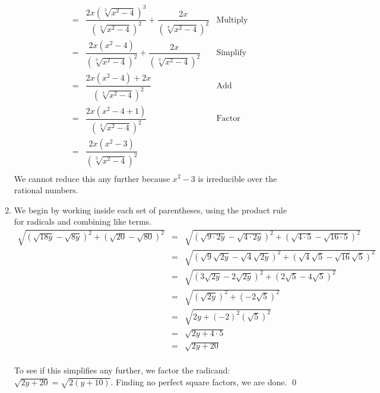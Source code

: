 \begin{ex}
\begin{enumerate}
\[\begin{array}{rclr}
& = & \dfrac{2x(\sqrt[3]{x^2-4})^3}{(\sqrt[3]{x^2-4})^2} + \dfrac{2x}{(\sqrt[3]{x^2-4})^2} & \text{Multiply}\\[12pt]

& = & \dfrac{2x(x^2-4)}{(\sqrt[3]{x^2-4})^2} + \dfrac{2x}{(\sqrt[3]{x^2-4})^2} & \text{Simplify}\\ [12pt]

& = & \dfrac{2x(x^2-4) + 2x}{(\sqrt[3]{x^2-4})^2} & \text{Add} \\ [12pt]


& = & \dfrac{2x(x^2-4 +1)}{(\sqrt[3]{x^2-4})^2} & \text{Factor}\\ [12pt]


& = & \dfrac{2x(x^2-3)}{(\sqrt[3]{x^2-4})^2} & \\

\end{array}\] We cannot reduce this any further because $x^2 - 3$ is irreducible over the rational numbers. 


\item  We begin by working inside each set of parentheses, using the product rule for radicals and combining like terms.\[ \begin{array}{rclr}


 \sqrt{(\sqrt{18y} - \sqrt{8y})^2 + (\sqrt{20} - \sqrt{80})^2} & = & \sqrt{(\sqrt{9\cdot 2y} - \sqrt{4 \cdot 2y})^2 + (\sqrt{4\cdot 5} - \sqrt{16 \cdot 5})^2} & \\[8pt]

& = & \sqrt{(\sqrt{9} \sqrt{2y} - \sqrt{4}\sqrt{2y})^2 + (\sqrt{4}\sqrt{5} - \sqrt{16}\sqrt{5})^2} & \\[8pt]


& = & \sqrt{(3\sqrt{2y} - 2\sqrt{2y})^2 + (2\sqrt{5} - 4\sqrt{5})^2} & \\[8pt]

& = & \sqrt{(\sqrt{2y})^2 + (-2\sqrt{5})^2} & \\[8pt]


& = & \sqrt{2y + (-2)^2(\sqrt{5})^2} & \\[8pt]


& = & \sqrt{2y + 4\cdot 5} & \\[8pt]

& = & \sqrt{2y + 20} & \\ 

\end{array} \]

To see if this simplifies any further, we factor the radicand:  $\sqrt{2y+20} = \sqrt{2(y+10)}$.  Finding no perfect square factors, we are done. \qed

\end{enumerate}

\end{ex}

